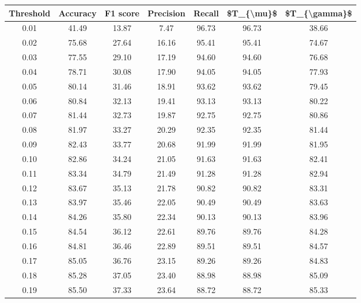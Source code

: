 \begin{tabular}{|c|c|c|c|c|c|c|}
\hline
 Threshold &  Accuracy &  F1 score &  Precision &  Recall &  \$T\_\{\textbackslash mu\}\$ &  \$T\_\{\textbackslash gamma\}\$ \\
\hline
      0.01 &     41.49 &     13.87 &       7.47 &   96.73 &      96.73 &         38.66 \\
      0.02 &     75.68 &     27.64 &      16.16 &   95.41 &      95.41 &         74.67 \\
      0.03 &     77.55 &     29.10 &      17.19 &   94.60 &      94.60 &         76.68 \\
      0.04 &     78.71 &     30.08 &      17.90 &   94.05 &      94.05 &         77.93 \\
      0.05 &     80.14 &     31.46 &      18.91 &   93.62 &      93.62 &         79.45 \\
      0.06 &     80.84 &     32.13 &      19.41 &   93.13 &      93.13 &         80.22 \\
      0.07 &     81.44 &     32.73 &      19.87 &   92.75 &      92.75 &         80.86 \\
      0.08 &     81.97 &     33.27 &      20.29 &   92.35 &      92.35 &         81.44 \\
      0.09 &     82.43 &     33.77 &      20.68 &   91.99 &      91.99 &         81.95 \\
      0.10 &     82.86 &     34.24 &      21.05 &   91.63 &      91.63 &         82.41 \\
      0.11 &     83.34 &     34.79 &      21.49 &   91.28 &      91.28 &         82.94 \\
      0.12 &     83.67 &     35.13 &      21.78 &   90.82 &      90.82 &         83.31 \\
      0.13 &     83.97 &     35.46 &      22.05 &   90.49 &      90.49 &         83.63 \\
      0.14 &     84.26 &     35.80 &      22.34 &   90.13 &      90.13 &         83.96 \\
      0.15 &     84.54 &     36.12 &      22.61 &   89.76 &      89.76 &         84.28 \\
      0.16 &     84.81 &     36.46 &      22.89 &   89.51 &      89.51 &         84.57 \\
      0.17 &     85.05 &     36.76 &      23.15 &   89.26 &      89.26 &         84.83 \\
      0.18 &     85.28 &     37.05 &      23.40 &   88.98 &      88.98 &         85.09 \\
      0.19 &     85.50 &     37.33 &      23.64 &   88.72 &      88.72 &         85.33 \\

\end{tabular}
